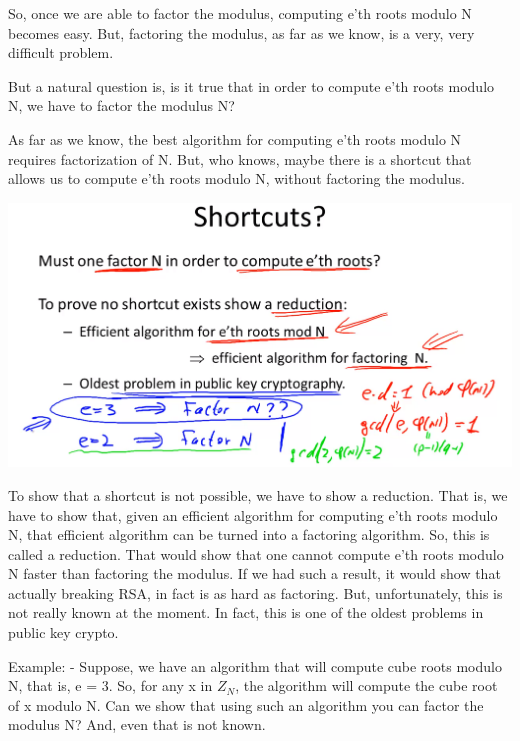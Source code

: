 \documentclass[11pt]{article}
\makeatletter
\def\maxwidth{\ifdim\Gin@nat@width>\linewidth\linewidth
    \else\Gin@nat@width\fi}
\let\Oldincludegraphics\includegraphics
\renewcommand{\includegraphics}[1]{\Oldincludegraphics[width=.8\maxwidth]{#1}}
\makeatother
\begin{document}
So, once we are able to factor the modulus, computing e'th roots modulo
N becomes easy. But, factoring the modulus, as far as we know, is a
very, very difficult problem.

But a natural question is, is it true that in order to compute e'th
roots modulo N, we have to factor the modulus N?

As far as we know, the best algorithm for computing e'th roots modulo N
requires factorization of N. But, who knows, maybe there is a shortcut
that allows us to compute e'th roots modulo N, without factoring the
modulus.

\includegraphics{./Images/ethRootShortcut.png}

To show that a shortcut is not possible, we have to show a reduction.
That is, we have to show that, given an efficient algorithm for
computing e'th roots modulo N, that efficient algorithm can be turned
into a factoring algorithm. So, this is called a reduction. That would
show that one cannot compute e'th roots modulo N faster than factoring
the modulus. If we had such a result, it would show that actually
breaking RSA, in fact is as hard as factoring. But, unfortunately, this
is not really known at the moment. In fact, this is one of the oldest
problems in public key crypto.

Example: - Suppose, we have an algorithm that will compute cube roots
modulo N, that is, e = 3. So, for any x in \(Z_{N}\), the algorithm will
compute the cube root of x modulo N. Can we show that using such an
algorithm you can factor the modulus N? And, even that is not known.
\end{document}
